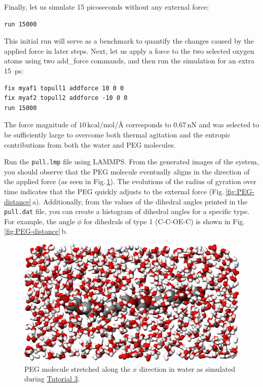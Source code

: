 \documentclass[9pt,tutorial]{livecoms}
\newcommand{\lmpcmd}[1]{\hspace{0pt}\colorbox{listing}{\textcolor{command}{\small{#1}}}\hspace{0pt}} %
\newcommand{\flecmd}[1]{\textcolor{command}{\texttt{#1}}} %
\begin{document}
Finally, let us simulate 15 picoseconds without any external force:
\begin{lstlisting}
run 15000
\end{lstlisting}
This initial run will serve as a benchmark to quantify the changes caused by
the applied force in later steps.  Next, let us apply a force to the two selected
oxygen atoms using two \lmpcmd{add\_force} commands, and then run the simulation
for an extra 15~ps:
\begin{lstlisting}
fix myaf1 topull1 addforce 10 0 0
fix myaf2 topull2 addforce -10 0 0
run 15000
\end{lstlisting}
The force magnitude of $10\,\text{kcal/mol/\AA{}}$ corresponds to $0.67\,\text{nN}$
and was selected to be sufficiently large to overcome both thermal agitation and
the entropic contributions from both the water and PEG molecules.

Run the \flecmd{pull.lmp} file using LAMMPS.  From the generated images of the system,
you should observe that the PEG molecule eventually aligns
in the direction of the applied force (as seen in Fig.\,\ref{fig:PEG-in-water}).
The evolutions of the radius of gyration over
time indicates that the PEG quickly adjusts to the external force
(Fig.\,\ref{fig:PEG-distance}\,a).  Additionally, from the values of the dihedral angles
printed in the \flecmd{pull.dat} file, you can create a histogram
of dihedral angles for a specific type.  For example, the angle $\phi$ for dihedrals
of type 1 (C-C-OE-C) is shown in Fig.\,\ref{fig:PEG-distance}\,b.

\begin{figure}
\centering
\includegraphics[width=\linewidth]{PEG-in-water}
\caption{PEG molecule stretched along the $x$ direction in water
as simulated during \hyperref[all-atom-label]{Tutorial 3}.}
\label{fig:PEG-in-water}
\end{figure}
\end{document}
